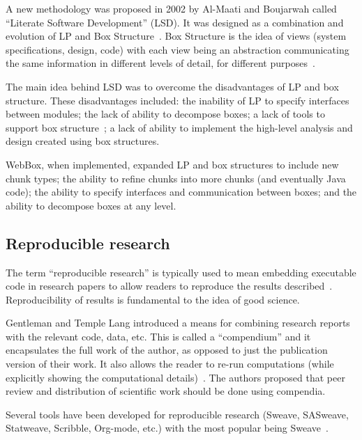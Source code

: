 \documentclass[preprint, 10pt]{sigplanconf}
\begin{document}
A new methodology was proposed in 2002 by Al-Maati and Boujarwah called
``Literate Software Development'' (LSD). It was designed as a combination and
evolution of LP and Box Structure~\cite{Mills1986}. Box Structure
is the idea of views (system specifications, design, code) with each view being
an abstraction communicating the same information in different levels of detail,
for different purposes~\cite{AlMatiiAndBoujarwah2002}.

The main idea behind LSD was to overcome the disadvantages of LP and box
structure. These disadvantages included: the inability of LP to specify
interfaces between modules; the lack of ability to decompose boxes; a lack of
tools to support box structure~\cite{Deck1996}; a lack of ability to implement
the high-level analysis and design created using box structures.

WebBox, when implemented, expanded LP and box structures to include new chunk
types; the ability to refine chunks into more chunks (and eventually Java code);
the ability to specify interfaces and communication between boxes; and the
ability to decompose boxes at any level.


\subsection{Reproducible research} 
\label{subsec:rr}

The term ``reproducible research'' is typically used to mean embedding
executable code in research papers to allow readers to reproduce the
results described~\cite{SchulteEtAl2012}. Reproducibility of results is
fundamental to the idea of good science. %

Gentleman and Temple Lang introduced a means for combining research reports with
the relevant code, data, etc. This is called a ``compendium'' and it
encapsulates the full work of the author, as opposed to just the publication
version of their work. It also allows the reader to re-run computations (while
explicitly showing the computational details)~\cite{GentlemanAndLang2012}. The
authors proposed that peer review and distribution of scientific work should be
done using compendia.

Several tools have been developed for reproducible research (Sweave, SASweave,
Statweave, Scribble, Org-mode, etc.) with the most popular being
Sweave~\cite{SchulteEtAl2012}.
\end{document}

